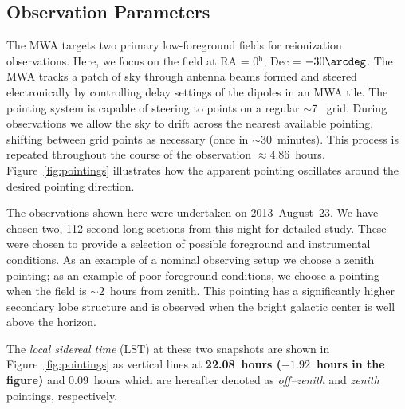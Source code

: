 \documentclass[preprint2,iop,numberedappendix]{emulateapj}
\begin{document}
\subsection{Observation Parameters}\label{sec:obsparms}

The MWA targets two primary low-foreground fields for reionization observations. Here, we focus on the field at RA = 0$^\textrm{h}$, Dec = $-30\arcdeg$. The MWA tracks a patch of sky through antenna beams formed and steered electronically by controlling delay settings of the dipoles in an MWA tile. The pointing system is capable of steering to points on a regular $\sim$7\arcdeg~ grid. During observations we allow the sky to drift across the nearest available pointing, shifting between grid points as necessary (once in $\sim 30$~minutes). This process is repeated throughout the course of the observation $\approx 4.86$~hours. Figure~\ref{fig:pointings} illustrates how the apparent pointing oscillates around the desired pointing direction. 

The observations shown here were undertaken on 2013~August~23. %
We have chosen two, 112 second long sections from this night for detailed study. These were chosen to provide a selection of possible foreground and instrumental conditions. As an example of a nominal observing setup we choose a zenith pointing; as an example of poor foreground conditions, we choose a pointing when the field is $\sim 2$~hours from zenith. This pointing has a significantly higher secondary lobe structure and is observed when the bright galactic center is well above the horizon. 

The {\it local sidereal time} (LST) at these two snapshots are shown in Figure~\ref{fig:pointings} as vertical lines at {\bf 22.08~hours ($-1.92$~hours in the figure)} and 0.09~hours which are hereafter denoted as {\it off--zenith} and {\it zenith} pointings, respectively. 
\end{document}
